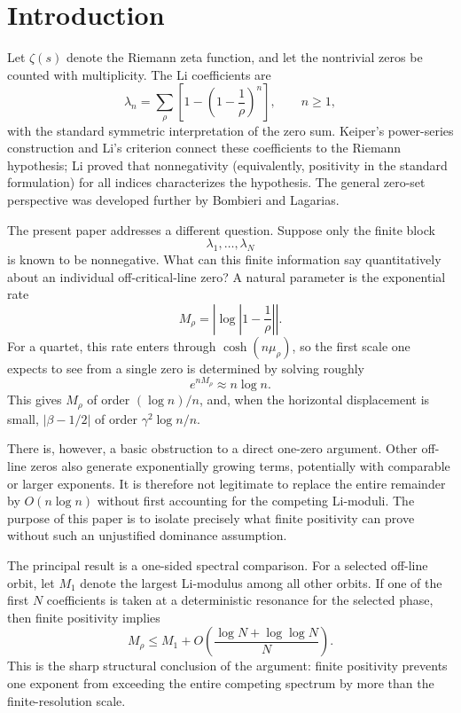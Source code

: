 \documentclass[11pt]{article}
\newcommand{\Li}{\lambda}
\newcommand{\zetaR}{\zeta}
\begin{document}
\section{Introduction}

Let \(\zetaR(s)\) denote the Riemann zeta function, and let the nontrivial zeros be counted with multiplicity. The Li coefficients are
\[
\Li_n=\sum_\rho\left[1-\left(1-\frac1\rho\right)^n\right],\qquad n\ge1,
\]
with the standard symmetric interpretation of the zero sum. Keiper's power-series construction and Li's criterion connect these coefficients to the Riemann hypothesis; Li proved that nonnegativity (equivalently, positivity in the standard formulation) for all indices characterizes the hypothesis. The general zero-set perspective was developed further by Bombieri and Lagarias. \cite{Keiper1992,Li1997,BombieriLagarias1999}

The present paper addresses a different question. Suppose only the finite block
\[
\Li_1,\ldots,\Li_N
\]
is known to be nonnegative. What can this finite information say quantitatively about an individual off-critical-line zero? A natural parameter is the exponential rate
\[
M_\rho=\left|\log\left|1-\frac1\rho\right|\right|.
\]
For a quartet, this rate enters through \(\cosh(n\mu_\rho)\), so the first scale one expects to see from a single zero is determined by solving roughly
\[
e^{nM_\rho}\approx n\log n.
\]
This gives \(M_\rho\) of order \((\log n)/n\), and, when the horizontal displacement is small, \(|\beta-1/2|\) of order \(\gamma^2\log n/n\).

There is, however, a basic obstruction to a direct one-zero argument. Other off-line zeros also generate exponentially growing terms, potentially with comparable or larger exponents. It is therefore not legitimate to replace the entire remainder by \(O(n\log n)\) without first accounting for the competing Li-moduli. The purpose of this paper is to isolate precisely what finite positivity can prove without such an unjustified dominance assumption.

The principal result is a one-sided spectral comparison. For a selected off-line orbit, let \(M_1\) denote the largest Li-modulus among all other orbits. If one of the first \(N\) coefficients is taken at a deterministic resonance for the selected phase, then finite positivity implies
\[
M_\rho\le M_1+O\!\left(\frac{\log N+\log\log N}{N}\right).
\]
This is the sharp structural conclusion of the argument: finite positivity prevents one exponent from exceeding the entire competing spectrum by more than the finite-resolution scale.
\end{document}
